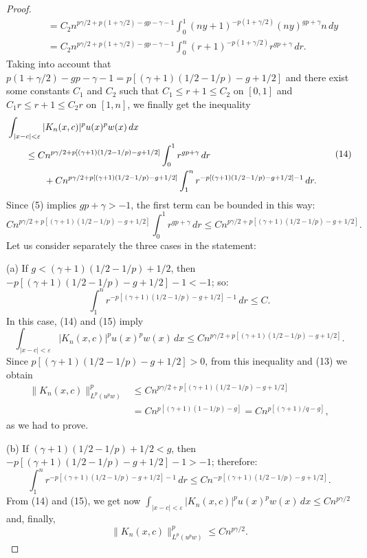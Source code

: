 \documentclass[a4paper,12pt]{article}
\theoremstyle{plain}
\theoremstyle{definition}
\begin{document}
\begin{proof}
\begin{align*}
&\qquad= C_{2} n^{p\gamma/2+p(1+\gamma/2)-gp-\gamma-1}
\int_{0}^{1} (ny + 1)^{-p(1+\gamma/2)} (ny)^{gp+\gamma} n\,dy \\
&\qquad= C_{2} n^{p\gamma/2+p(1+\gamma/2)-gp-\gamma-1}
\int_{0}^{n} (r + 1)^{-p(1+\gamma/2)} r^{gp+\gamma} \,dr.
\end{align*}
Taking into account that
$p (1+\gamma/2) - gp - \gamma - 1 = p [ (\gamma+1) (1/2 - 1/p) - g + 1/2]$
and there exist some constants $C_{1}$ and $C_{2}$ such that
$C_{1} \leq r+1 \leq C_{2}$ on $[0,1]$ and $C_{1}r \leq r+1 \leq C_{2}r$
on $[1,n]$, we finally get the inequality
\begin{equation}
\begin{aligned}
&\int_{| x - c | < \varepsilon} | K_{n}(x,c) |^{p} u(x)^{p} w(x)\,dx \\
&\qquad\leq C n^{p \gamma/2+p [ (\gamma+1)(1/2 - 1/p) - g+1/2 ]}
\int_{0}^{1} r^{gp+\gamma} \,dr \\
&\qquad\qquad\null+ C n^{p\gamma/2+p [ (\gamma+1)(1/2 - 1/p) - g+1/2 ]}
\int_{1}^{n} r^{-p [ (\gamma+1)(1/2 - 1/p) - g+1/2 ] -1} \,dr.
\end{aligned}
\tag{14}
\end{equation}
Since (5) implies $gp + \gamma > -1$,
the first term can be bounded in this way:
\begin{equation}
C n^{p\gamma/2+p [ (\gamma+1)(1/2 - 1/p) - g+1/2 ]}
\int_{0}^{1} r^{gp+\gamma} \,dr
\leq C n^{p \gamma/2+p [ (\gamma+1)(1/2 - 1/p) - g+1/2 ]}.
\tag{15}
\end{equation}
Let us consider separately the three cases in the statement:

    (a) If $g < (\gamma +1) (1/2 - 1/p) + 1/2$,
then $-p [ (\gamma +1) (1/2 - 1/p) -g+ 1/2 ] -1 < -1$; so:
$$
\int_{1}^{n} r^{-p [ (\gamma+1)(1/2 - 1/p) - g+1/2 ] -1} \,dr \leq C.
$$
In this case, (14) and (15) imply
$$
\int_{| x - c | < \varepsilon} | K_{n}(x,c) |^{p} u(x)^{p} w(x)\,dx
\leq C n^{p\gamma/2+p [ (\gamma+1)(1/2 - 1/p) - g+1/2 ]}.
$$
Since $p [ (\gamma +1)(1/2 - 1/p) - g+1/2 ] > 0$,
from this inequality and (13) we obtain
\begin{align*}
\| K_{n}(x,c) \|^{p}_{L^{p}(u^{p}w)}
&\leq C n^{p\gamma/2+p [ (\gamma+1)(1/2 - 1/p) - g+1/2 ]} \\
&= C n^{p [ (\gamma+1)(1 - 1/p) - g ]}
= C n^{p [ (\gamma+1)/q - g ]},
\end{align*}
as we had to prove.

    (b) If $(\gamma +1) (1/2 - 1/p) + 1/2 < g$,
then $-p [ (\gamma +1) (1/2 - 1/p) -g+ 1/2 ] -1 > -1$; therefore:
$$
\int_{1}^{n} r^{-p [ (\gamma+1)(1/2 - 1/p) - g+1/2 ] -1} \,dr
\leq C n^{-p [ (\gamma+1)(1/2 - 1/p) - g+1/2 ] }.
$$
From (14) and (15), we get now
$\int_{| x - c | < \varepsilon} | K_{n}(x,c) |^{p} u(x)^{p} w(x)\,dx
\leq C n^{p\gamma/2}$
and, finally,
$$
\| K_{n}(x,c) \|^{p}_{L^{p}(u^{p}w)} \leq C n^{p\gamma/2}.
$$


\end{proof}
\end{document}
